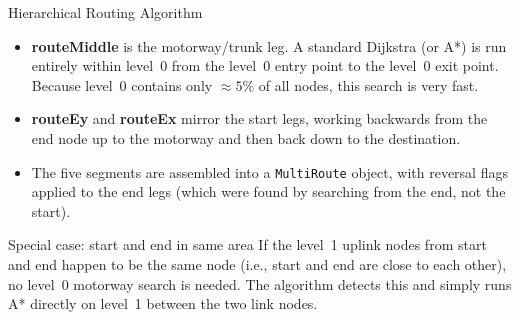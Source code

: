 \documentclass[aspectratio=169,10pt]{beamer}
\begin{document}
\begin{frame}[allowframebreaks]{Hierarchical Routing Algorithm}
\begin{itemize}
    \item \textbf{routeMiddle} is the motorway/trunk leg.  A standard
      Dijkstra (or A*) is run entirely within level~0 from the level~0
      entry point to the level~0 exit point.  Because level~0 contains
      only $\approx 5\%$ of all nodes, this search is very fast.

    \item \textbf{routeEy} and \textbf{routeEx} mirror the start legs,
      working backwards from the end node up to the motorway and then
      back down to the destination.

    \item The five segments are assembled into a \texttt{MultiRoute}
      object, with reversal flags applied to the end legs (which were
      found by searching from the end, not the start).
  \end{itemize}

  \begin{alertblock}{Special case: start and end in same area}
    If the level~1 uplink nodes from start and end happen to be the
    same node (i.e., start and end are close to each other), no level~0
    motorway search is needed.  The algorithm detects this and simply
    runs A* directly on level~1 between the two link nodes.
  \end{alertblock}
\end{frame}
\end{document}

